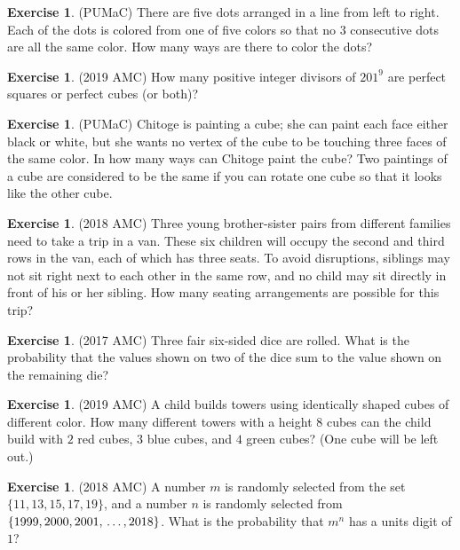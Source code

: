 \documentclass[letterpaper]{article}
\theoremstyle{remark}
\theoremstyle{definition}
\newtheorem{exercise}[thm]{Exercise}
\begin{document}
\begin{exercise}
(PUMaC) There are five dots arranged in a line from left to right. Each of the dots is colored from one of five colors so that no $3$ consecutive dots are all the same color. How many ways are there to color the dots?
\end{exercise}

\begin{exercise}
(2019 AMC) How many positive integer divisors of $201^9$ are perfect squares or perfect cubes (or both)?
\end{exercise}

\begin{exercise}
(PUMaC) Chitoge is painting a cube; she can paint each face either black or white, but she wants no vertex of the cube to be touching three faces of the same color. In how many ways can Chitoge paint the cube? Two paintings of a cube are considered to be the same if you can rotate one cube so that it looks like the other cube.
\end{exercise}

\begin{exercise}
(2018 AMC) Three young brother-sister pairs from different families need to take a trip in a van. These six children will occupy the second and third rows in the van, each of which has three seats. To avoid disruptions, siblings may not sit right next to each other in the same row, and no child may sit directly in front of his or her sibling. How many seating arrangements are possible for this trip?
\end{exercise}

\begin{exercise}
(2017 AMC) Three fair six-sided dice are rolled. What is the probability that the values shown on two of the dice sum to the value shown on the remaining die?
\end{exercise}

\begin{exercise}
(2019 AMC) A child builds towers using identically shaped cubes of different color. How many different towers with a height $8$ cubes can the child build with $2$ red cubes, $3$ blue cubes, and $4$ green cubes? (One cube will be left out.)
\end{exercise}

\begin{exercise}
(2018 AMC) A number $m$ is randomly selected from the set $\{11,13,15,17,19\}$, and a number $n$ is randomly selected from $\{1999,2000,2001,\newline \ldots,2018\}$. What is the probability that $m^n$ has a units digit of $1$?
\end{exercise}
\end{document}
